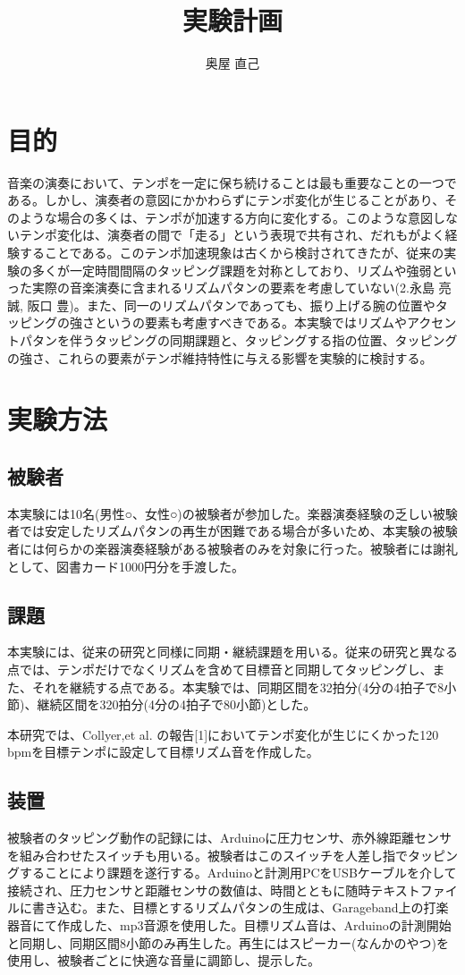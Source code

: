 \documentclass[twocolumn,10pt]{jarticle}
\title{実験計画}
\author{奥屋 直己}
\begin{document}
\maketitle

\section{目的}
音楽の演奏において、テンポを一定に保ち続けることは最も重要なことの一つである。しかし、演奏者の意図にかかわらずにテンポ変化が生じることがあり、そのような場合の多くは、テンポが加速する方向に変化する。このような意図しないテンポ変化は、演奏者の間で「走る」という表現で共有され、だれもがよく経験することである。このテンポ加速現象は古くから検討されてきたが、従来の実験の多くが一定時間間隔のタッピング課題を対称としており、リズムや強弱といった実際の音楽演奏に含まれるリズムパタンの要素を考慮していない(2.永島 亮誠, 阪口 豊)。また、同一のリズムパタンであっても、振り上げる腕の位置やタッピングの強さというの要素も考慮すべきである。本実験ではリズムやアクセントパタンを伴うタッピングの同期課題と、タッピングする指の位置、タッピングの強さ、これらの要素がテンポ維持特性に与える影響を実験的に検討する。

\section{実験方法}
\subsection{被験者}
本実験には10名(男性○、女性○)の被験者が参加した。楽器演奏経験の乏しい被験者では安定したリズムパタンの再生が困難である場合が多いため、本実験の被験者には何らかの楽器演奏経験がある被験者のみを対象に行った。被験者には謝礼として、図書カード1000円分を手渡した。
\subsection{課題}
本実験には、従来の研究と同様に同期・継続課題を用いる。従来の研究と異なる点では、テンポだけでなくリズムを含めて目標音と同期してタッピングし、また、それを継続する点である。本実験では、同期区間を32拍分(4分の4拍子で8小節)、継続区間を320拍分(4分の4拍子で80小節)とした。

本研究では、Collyer,et al. の報告[1]においてテンポ変化が生じにくかった120 bpmを目標テンポに設定して目標リズム音を作成した。

\subsection{装置}
被験者のタッピング動作の記録には、Arduinoに圧力センサ、赤外線距離センサを組み合わせたスイッチも用いる。被験者はこのスイッチを人差し指でタッピングすることにより課題を遂行する。Arduinoと計測用PCをUSBケーブルを介して接続され、圧力センサと距離センサの数値は、時間とともに随時テキストファイルに書き込む。また、目標とするリズムパタンの生成は、Garageband上の打楽器音にて作成した、mp3音源を使用した。目標リズム音は、Arduinoの計測開始と同期し、同期区間8小節のみ再生した。再生にはスピーカー(なんかのやつ)を使用し、被験者ごとに快適な音量に調節し、提示した。
\end{document}
